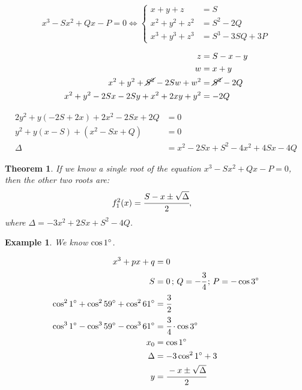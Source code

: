 \documentclass[11pt,a4paper]{article}
\newtheorem{thm}{Theorem}
\newtheorem{example}{Example}
\begin{document}
\begin{equation*}
x^3 - Sx^2 + Qx - P = 0 \Leftrightarrow \left\{\begin{aligned}
x + y + z &= S \\
x^2 + y^2 + z^2 &= S^2 - 2Q \\
x^3 + y^3 + z^3 &= S^3 - 3SQ + 3P
\end{aligned}\right.
\end{equation*}

\begin{align}
z &= S - x - y \\
w &= x + y \\
x^2 + y^2 + \cancel{S^2} - 2Sw + w^2 &= \cancel{S^2} - 2Q \\
x^2 + y^2 - 2Sx - 2Sy + x^2 + 2xy + y^2 &= - 2Q
\end{align}

\begin{align}
2y^2 + y(- 2S + 2x) + 2x^2 - 2Sx + 2Q &= 0 \\
y^2 + y(x - S) + (x^2 - Sx + Q) &= 0 \\
\Delta &= x^2 - 2Sx + S^2 - 4x^2 + 4 Sx - 4Q
\end{align}

\vspace{3mm}

\begin{thm}
If we know a single root of the equation $x^3 - Sx^2 + Qx - P = 0$, \\
then the other two roots are:
\begin{align}
f_1^2(x) &= \cfrac{S - x \pm \sqrt{\Delta}}{2},
\end{align}
where $\Delta = -3x^2 + 2Sx + S^2 - 4Q$.
\end{thm}

\vspace{3mm}

\begin{example}
We know $\cos 1\degree$.
\end{example}

\begin{align}
x^3 + px + q &= 0 \\
S &= 0\,;\,Q = -\cfrac{3}{4}\,;\,P = - \cos 3\degree \\
\cos^2 1\degree + \cos^2 59\degree + \cos^2 61\degree &= \cfrac{3}{2} \\
\cos^3 1\degree - \cos^3 59\degree - \cos^3 61\degree &= \cfrac{3}{4} \cdot \cos 3\degree \\
x_0 &= \cos 1\degree \\
\Delta &= -3 \cos^2 1\degree + 3 \\
y &= \cfrac{- x \pm \sqrt{\Delta}}{2}
\end{align}
\end{document}
